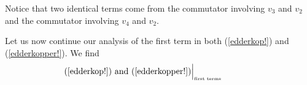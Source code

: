 \documentclass[12pt]{article}
\newcommand{\nn}{\nonumber}
\def\e{\epsilon}
\def\cl{{\cal L}}
\begin{document}
\begin{appendix}
Notice that two identical terms come from the commutator involving $v_3$ and $v_2$ and the commutator involving $v_4$ and $v_2$. 

Let us now continue our analysis of the first term in both (\ref{edderkop!}) and (\ref{edderkopper!}). We find
\begin{eqnarray}
\mbox{(\ref{edderkop!}) and (\ref{edderkopper!})}\Big\vert_{\mbox{\tiny first terms}} \hspace{1cm} &&\nn\\
%
%
%

\end{eqnarray}
\end{appendix}
\end{document}
